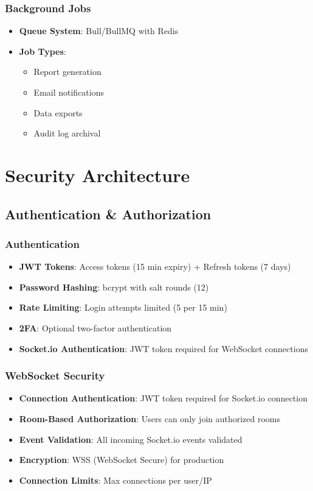 \documentclass[11pt,a4paper]{article}
\begin{document}
\subsubsection{Background Jobs}
\begin{itemize}
    \item \textbf{Queue System}: Bull/BullMQ with Redis
    \item \textbf{Job Types}:
    \begin{itemize}
        \item Report generation
        \item Email notifications
        \item Data exports
        \item Audit log archival
    \end{itemize}
\end{itemize}

\section{Security Architecture}

\subsection{Authentication \& Authorization}

\subsubsection{Authentication}
\begin{itemize}
    \item \textbf{JWT Tokens}: Access tokens (15 min expiry) + Refresh tokens (7 days)
    \item \textbf{Password Hashing}: bcrypt with salt rounds (12)
    \item \textbf{Rate Limiting}: Login attempts limited (5 per 15 min)
    \item \textbf{2FA}: Optional two-factor authentication
    \item \textbf{Socket.io Authentication}: JWT token required for WebSocket connections
\end{itemize}

\subsubsection{WebSocket Security}
\begin{itemize}
    \item \textbf{Connection Authentication}: JWT token required for Socket.io connection
    \item \textbf{Room-Based Authorization}: Users can only join authorized rooms
    \item \textbf{Event Validation}: All incoming Socket.io events validated
    \item \textbf{Encryption}: WSS (WebSocket Secure) for production
    \item \textbf{Connection Limits}: Max connections per user/IP
\end{itemize}
\end{document}
